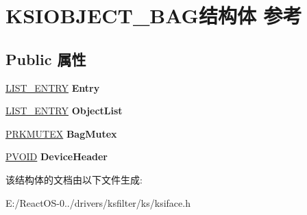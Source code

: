 \hypertarget{struct_k_s_i_o_b_j_e_c_t___b_a_g}{}\section{K\+S\+I\+O\+B\+J\+E\+C\+T\+\_\+\+B\+A\+G结构体 参考}
\label{struct_k_s_i_o_b_j_e_c_t___b_a_g}
\subsection*{Public 属性}
\begin{DoxyCompactItemize}
\item 
\mbox{\label{struct_k_s_i_o_b_j_e_c_t___b_a_g_a932bd7058c23ec8b00800aa44183b8f5}} 
\hyperlink{struct___l_i_s_t___e_n_t_r_y}{L\+I\+S\+T\+\_\+\+E\+N\+T\+RY} {\bfseries Entry}
\item 
\mbox{\label{struct_k_s_i_o_b_j_e_c_t___b_a_g_a090cb38cf7ec3ac34d034b4e0df41e5a}} 
\hyperlink{struct___l_i_s_t___e_n_t_r_y}{L\+I\+S\+T\+\_\+\+E\+N\+T\+RY} {\bfseries Object\+List}
\item 
\mbox{\label{struct_k_s_i_o_b_j_e_c_t___b_a_g_aabb18898f35a4108bc4e83ad6d929649}} 
\hyperlink{struct___k_m_u_t_a_n_t}{P\+R\+K\+M\+U\+T\+EX} {\bfseries Bag\+Mutex}
\item 
\mbox{\label{struct_k_s_i_o_b_j_e_c_t___b_a_g_a000071a2f900f25683d151e2d6df8691}} 
\hyperlink{interfacevoid}{P\+V\+O\+ID} {\bfseries Device\+Header}
\end{DoxyCompactItemize}


该结构体的文档由以下文件生成\+:\begin{DoxyCompactItemize}
\item 
E\+:/\+React\+O\+S-\/0../drivers/ksfilter/ks/ksiface.\+h\end{DoxyCompactItemize}
